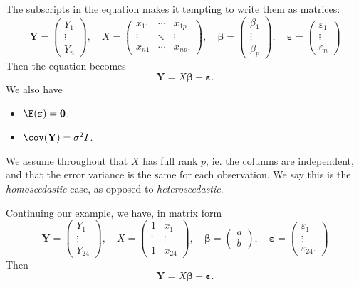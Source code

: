\documentclass[a4paper]{article}
\begin{document}
The subscripts in the equation makes it tempting to write them as matrices:
\[
  \mathbf{Y} =
  \begin{pmatrix}
    Y_1\\
    \vdots\\
    Y_n
  \end{pmatrix}, \quad
  X =
  \begin{pmatrix}
    x_{11} & \cdots & x_{1p}\\
    \vdots & \ddots & \vdots\\
    x_{n1} & \cdots & x_{np}.
  \end{pmatrix},\quad
  \boldsymbol\beta =
  \begin{pmatrix}
    \beta_1\\
    \vdots\\
    \beta_p
  \end{pmatrix}, \quad
  \boldsymbol\varepsilon =
  \begin{pmatrix}
    \varepsilon_1\\
    \vdots\\
    \varepsilon_n
  \end{pmatrix}
\]
Then the equation becomes
\[
  \mathbf{Y} = X\boldsymbol\beta + \boldsymbol\varepsilon.\tag{2}
\]
We also have
\begin{itemize}
  \item $\E(\boldsymbol\varepsilon) = \mathbf{0}$.
  \item $\cov (\mathbf{Y}) = \sigma^2 I$.
\end{itemize}
We assume throughout that $X$ has full rank $p$, ie. the columns are independent, and that the error variance is the same for each observation. We say this is the \emph{homoscedastic} case, as opposed to \emph{heteroscedastic}.

\begin{eg}
  Continuing our example, we have, in matrix form
  \[
    \mathbf{Y} =
    \begin{pmatrix}
      Y_1\\
      \vdots\\
      Y_{24}
    \end{pmatrix}, \quad
    X =
    \begin{pmatrix}
      1 & x_1\\
      \vdots & \vdots \\
      1 & x_{24}
    \end{pmatrix}, \quad
    \boldsymbol\beta =
    \begin{pmatrix}
      a\\
      b
    \end{pmatrix}, \quad
    \boldsymbol\varepsilon =
    \begin{pmatrix}
      \varepsilon_1\\
      \vdots\\
      \varepsilon_{24}.
    \end{pmatrix}
  \]
  Then
  \[
    \mathbf{Y} = X\boldsymbol\beta + \boldsymbol\varepsilon.
  \]
\end{eg}
\end{document}

